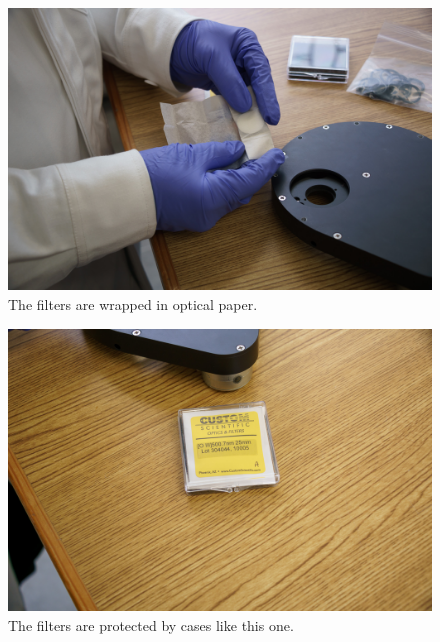 \begin{figure}
\begin{center}
\includegraphics[width=0.8\linewidth]{figures/huitzi-filter-paper.jpg}
\end{center}
\caption{The filters are wrapped in optical paper.}
\label{figure:huitzi-filter-paper}
\end{figure}

\begin{figure}
\begin{center}
\includegraphics[width=0.8\linewidth]{figures/huitzi-filter-case.jpg}
\end{center}
\caption{The filters are protected by cases like this one.}
\label{figure:huitzi-filter-case}
\end{figure}

